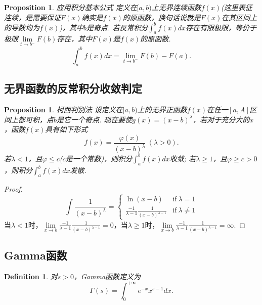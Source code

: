 \documentclass{article}
\newtheorem{proposition}[theorem]{Proposition}
\newtheorem{definition}[theorem]{Definition}
\begin{document}
\begin{proposition}
\rm {\color{red} 应用积分基本公式} 定义在$[a,b)$上无界连续函数$f(x)$({\color{blue}这里表征连续，是需要保证$F(x)$确实是$f(x)$的原函数，换句话说就是$F(x)$在其区间上的导数均为$f(x)$})，其中$b$是奇点. 若反常积分$\int_a^b f(x)dx$存在有限极限，等价于极限$\lim\limits_{t \rightarrow b^-}F(b)$存在，其中$F(x)$是$f(x)$的原函数. 
$$
\int_a^b f(x)dx = \lim\limits_{t \rightarrow b^-}F(b)-F(a).
$$
\end{proposition}

\subsection{无界函数的反常积分收敛判定}

\begin{proposition}
\rm {\color{red} 柯西判别法} 设定义在$[a,b)$上的无界正函数$f(x)$在任一$[a,A]$区间上都可积，点$b$是它一个奇点. 现在要使$g(x)=(x-b)^\lambda$，若对于充分大的$x$，函数$f(x)$具有如下形式
$$
f(x) = \frac{\varphi(x)}{(x-b)^\lambda}~(\lambda > 0).
$$
若$\lambda < 1$，且$\varphi \leq c$($c$是一个常数)，则积分$\int_a^b f(x)dx$收敛; 若$\lambda \geq 1$，且$\varphi \geq c > 0$，则积分$\int_a^b f(x)dx$发散.
\end{proposition}

\begin{proof}
$$
\int \frac{1}{(x-b)^\lambda} = \left\{ \begin{array}{ll}
\ln(x-b) & \text{if}~\lambda = 1\\
\frac{-1}{\lambda-1}\frac{1}{(x-b)^{\lambda-1}} & \text{if}~\lambda \neq 1
\end{array} \right.
$$
当$\lambda < 1$时，$\lim\limits_{x \rightarrow b} \frac{-1}{\lambda-1}\frac{1}{(x-b)^{\lambda-1}} = 0$，当$\lambda \geq 1$时，$\lim\limits_{x \rightarrow b} \frac{-1}{\lambda-1}\frac{1}{(x-b)^{\lambda-1}} = \infty$.
\end{proof}

\subsection{Gamma函数}

\begin{definition}
\rm 对$s > 0$，Gamma函数定义为
$$
\Gamma(s) = \int_0^{+\infty} e^{-x}x^{s-1}dx.
$$
\begin{center}
\end{center}
\end{definition}
\end{document}
